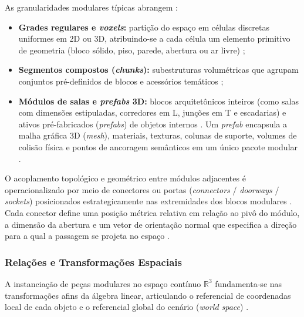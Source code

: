 As granularidades modulares típicas abrangem \cite{linden2014dungeons, shaker2016constructive, vieira2024metodologia}:
\begin{itemize}
    \item \textbf{Grades regulares e \textit{voxels}:} partição do espaço em células discretas uniformes em 2D ou 3D, atribuindo-se a cada célula um elemento primitivo de geometria (bloco sólido, piso, parede, abertura ou ar livre) \cite{pcgbook, shaker2016constructive, summerville2018procedural};
    \item \textbf{Segmentos compostos (\textit{chunks}):} subestruturas volumétricas que agrupam conjuntos pré-definidos de blocos e acessórios temáticos \cite{linden2014dungeons, shaker2016constructive};
    \item \textbf{Módulos de salas e \textit{prefabs} 3D:} blocos arquitetônicos inteiros (como salas com dimensões estipuladas, corredores em L, junções em T e escadarias) e ativos pré-fabricados (\textit{prefabs}) de objetos internos \cite{linden2014dungeons, xu2025databasedrivenframework3dlevel, regmi2025system}. Um \textit{prefab} encapsula a malha gráfica 3D (\textit{mesh}), materiais, texturas, colunas de suporte, volumes de colisão física e pontos de ancoragem semânticos em um único pacote modular \cite{xu2025databasedrivenframework3dlevel, regmi2025system}.
\end{itemize}

O acoplamento topológico e geométrico entre módulos adjacentes é operacionalizado por meio de conectores ou portas (\textit{connectors} / \textit{doorways} / \textit{sockets}) posicionados estrategicamente nas extremidades dos blocos modulares \cite{linden2013designing, linden2014dungeons, shaker2016constructive, sun2024roomplanner}. Cada conector define uma posição métrica relativa em relação ao pivô do módulo, a dimensão da abertura e um vetor de orientação normal que especifica a direção para a qual a passagem se projeta no espaço \cite{linden2013designing, shaker2016constructive, sun2024roomplanner, xu2025databasedrivenframework3dlevel}.

\subsubsection{Relações e Transformações Espaciais}
\label{sec:transformacoes_espaciais}

A instanciação de peças modulares no espaço contínuo $\mathbb{R}^3$ fundamenta-se nas transformações afins da álgebra linear, articulando o referencial de coordenadas local de cada objeto e o referencial global do cenário (\textit{world space}) \cite{ericson2004realtime, sun2024roomplanner, xu2025constraint}.

